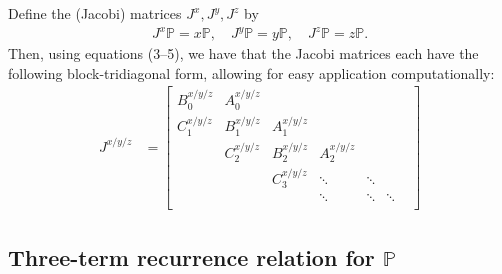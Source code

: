 \documentclass[11pt, oneside]{article}   	%
\newcommand{\bigP}{\mathbb{P}}
\begin{document}
Define the (Jacobi) matrices \(J^x, J^y, J^z\) by 
\begin{align}
J^x \bigP = x \bigP, \quad J^y \bigP = y \bigP, \quad J^z \bigP = z \bigP.
\end{align}
Then, using equations (3--5), we have that the Jacobi matrices each have the following block-tridiagonal form, allowing for easy application computationally:
\begin{align}
J^{x/y/z} &= \begin{bmatrix}
		B^{x/y/z}_0 & A^{x/y/z}_0 & & & & \\
		C^{x/y/z}_1 & B^{x/y/z}_1 & A^{x/y/z}_1 & & & \\
		& C^{x/y/z}_2 & B^{x/y/z}_2 & A^{x/y/z}_2  & & & \\
		& & C^{x/y/z}_3 & \ddots & \ddots & \\
		& & & \ddots & \ddots & \ddots \\
	\end{bmatrix}
\end{align}

\subsection{Three-term recurrence relation for \(\bigP\)}
\end{document}
